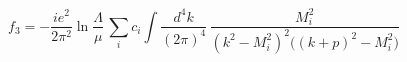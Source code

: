 \begin{equation}\label{F3}
f_3 =
- \frac{i e^2}{2\pi^2}\ln\frac{\Lambda}{\mu}\,
\sum\limits_i c_i
\int \frac{d^4k}{(2\pi)^4}\,\frac{M_i^2}{(k^2-M_i^2)^2
\Big((k+p)^2-M_i^2\Big)}\qquad\quad
\end{equation}

